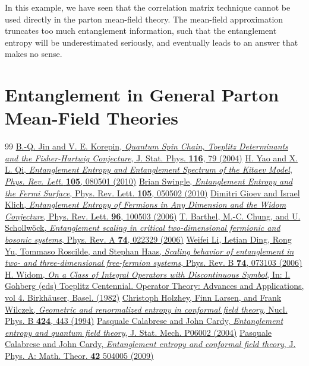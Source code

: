\documentclass[12font]{article}
\theoremstyle{definition}
\numberwithin{equation}{section}
\begin{document}
In this example, we have seen that the correlation matrix technique cannot be used directly in the parton mean-field theory. The mean-field approximation truncates too much entanglement information, such that the entanglement entropy will be underestimated seriously, and eventually leads to an answer that makes no sense.

\section{Entanglement in General Parton Mean-Field Theories}

\begin{thebibliography}{99}
    \href{https://link.springer.com/article/10.1023/B:JOSS.0000037230.37166.42}{B.-Q. Jin and V. E. Korepin, \emph{Quantum Spin Chain, Toeplitz Determinants and the Fisher-Hartwig Conjecture}, J. Stat. Phys. \textbf{116}, 79 (2004)}
    \href{https://doi.org/10.1103/PhysRevLett.105.080501}{H. Yao and X. L. Qi, \emph{Entanglement Entropy and Entanglement Spectrum of the Kitaev Model}, \emph{Phys. Rev. Lett.} \textbf{105}, 080501 (2010)}
    \href{https://doi.org/10.1103/PhysRevLett.105.050502}{Brian Swingle, \emph{Entanglement Entropy and the Fermi Surface}, Phys. Rev. Lett. \textbf{105}, 050502 (2010)}
    \href{https://doi.org/10.1103/PhysRevLett.96.100503}{Dimitri Gioev and Israel Klich, \emph{Entanglement Entropy of Fermions in Any Dimension and the Widom Conjecture}, Phys. Rev. Lett. \textbf{96}, 100503 (2006)}
    \href{https://doi.org/10.1103/PhysRevA.74.022329}{T. Barthel, M.-C. Chung, and U. Schollw\"ock, \emph{Entanglement scaling in critical two-dimensional fermionic and bosonic systems}, Phys. Rev. A \textbf{74}, 022329 (2006)}
    \href{https://doi.org/10.1103/PhysRevB.74.073103}{Weifei Li, Letian Ding, Rong Yu, Tommaso Roscilde, and Stephan Haas, \emph{Scaling behavior of entanglement in two- and three-dimensional free-fermion systems}, Phys. Rev. B \textbf{74}, 073103 (2006)}
    \href{https://doi.org/10.1007/978-3-0348-5183-1_28}{H. Widom, \emph{On a Class of Integral Operators with Discontinuous Symbol}, In: I. Gohberg (eds) Toeplitz Centennial. Operator Theory: Advances and Applications, vol 4. Birkhäuser, Basel. (1982)}
    \href{https://doi.org/10.1016/0550-3213(94)90402-2}{Christoph Holzhey, Finn Larsen, and Frank Wilczek, \emph{Geometric and renormalized entropy in conformal field theory}, Nucl. Phys. B \textbf{424}, 443 (1994)}
    \href{https://doi.org/10.1088/1742-5468/2004/06/P06002}{Pasquale Calabrese and John Cardy, \emph{Entanglement entropy and quantum field theory}, J. Stat. Mech. P06002 (2004)}
    \href{https://doi.org/10.1088/1751-8113/42/50/504005}{Pasquale Calabrese and John Cardy, \emph{Entanglement entropy and conformal field theory}, J. Phys. A: Math. Theor. \textbf{42} 504005 (2009)}
\end{thebibliography}
\end{document}
